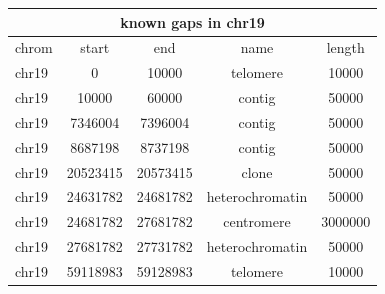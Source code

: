 \documentclass{standalone}
\begin{document}
\begin{tabular}{|l|c|c|c|c|}
\hline
\multicolumn{5}{|c|}{\textbf{known gaps in chr19}}\\
\hline 

chrom & start & end & name & length \\
\hline
chr19 & 0 & 10000 & telomere & 10000 \\
chr19 & 10000 & 60000 & contig & 50000 \\
chr19 & 7346004 & 7396004 & contig & 50000 \\
chr19 & 8687198 & 8737198 & contig & 50000 \\
chr19 & 20523415 & 20573415 & clone & 50000 \\
chr19 & 24631782 & 24681782 & heterochromatin & 50000 \\
chr19 & 24681782 & 27681782 & centromere & 3000000 \\
chr19 & 27681782 & 27731782 & heterochromatin & 50000 \\
chr19 & 59118983 & 59128983 & telomere & 10000 \\
\hline
\end{tabular}
\end{document}
